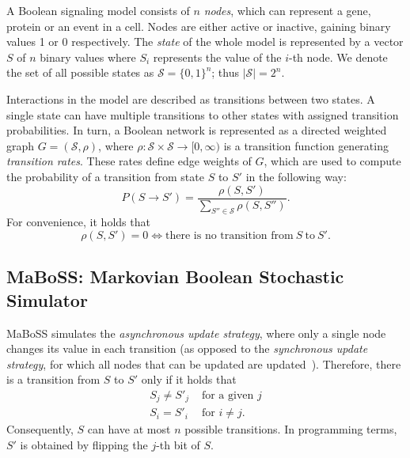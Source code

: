\documentclass[sn-mathphys-num]{sn-jnl}%
\begin{document}

A Boolean signaling model consists of $n$ \emph{nodes}, which can represent a gene, protein or an event in a cell. Nodes are either active or inactive, gaining binary values 1 or 0 respectively. The \emph{state} of the whole model is represented by a vector $S$ of $n$ binary values where $S_i$ represents the value of the $i$-th node. We denote the set of all possible states as $\mathcal{S} = \{0, 1\}^n$; thus $|\mathcal{S}| = 2^n$. 

Interactions in the model are described as transitions between two states. A single state can have multiple transitions to other states with assigned transition probabilities. In turn, a Boolean network is represented as a directed weighted graph $G = (\mathcal{S}, \rho)$, where $\rho: \mathcal{S} \times \mathcal{S} \rightarrow [0, \infty)$ is a transition function generating \emph{transition rates}. These rates define edge weights of $G$, which are used to compute the probability of a transition from state $S$ to $S'$ in the following way:
\begin{equation}
    P(S \rightarrow S') = \frac{\rho(S, S')}{\sum_{S'' \in \mathcal{S}} \rho(S, S'')}.
    \label{eq:transition}
\end{equation}
For convenience, it holds that
\begin{equation}
\rho(S, S') = 0 \iff \text{there is no transition from}\ S\ \text{to}\ S'.
\end{equation}


\subsection{MaBoSS: Markovian Boolean Stochastic Simulator}
MaBoSS simulates the \emph{asynchronous update strategy}, where only a single node changes its value in each transition (as opposed to the \emph{synchronous update strategy}, for which all nodes that can be updated are updated~\cite{stoll2012continuous}). Therefore, there is a transition from $S$ to $S'$ only if it holds that 
\begin{equation}
    \begin{split}
S_j \ne S'_j & \text{ for a given } j \\
S_i = S'_i & \text{ for } i \ne j.
    \end{split}
\end{equation}
Consequently, $S$ can have at most $n$ possible transitions. In programming terms, $S'$ is obtained by flipping the $j$-th bit of $S$.
\end{document}

